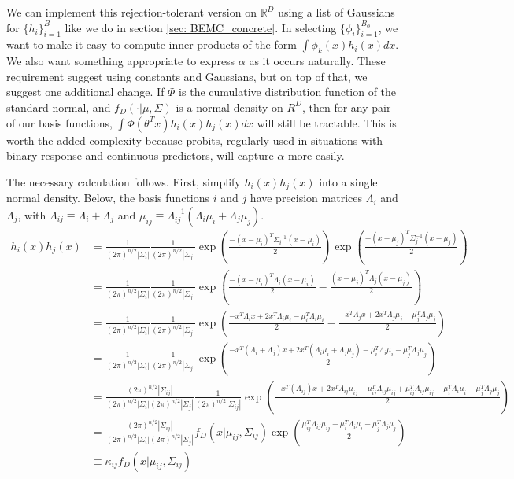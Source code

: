 \documentclass{article}
\begin{document}
We can implement this rejection-tolerant version on $\mathbb{R}^D$ using a list of Gaussians for $\{h_i\}_{i=1}^B$ like we do in section \ref{sec: BEMC_concrete}. In selecting $\{\phi_i\}_{i=1}^{B_\phi}$, we want to make it easy to compute inner products of the form $\int \phi_k(x)h_i(x)dx$. We also want something appropriate to express $\alpha$ as it occurs naturally. These requirement suggest using constants and Gaussians, but on top of that, we suggest one additional change. If $\Phi$ is the cumulative distribution function of the standard normal, and $f_D(\cdot|\mu, \Sigma)$ is a normal density on $R^D$, then for any pair of our basis functions, $\int \Phi(\theta ^T x)h_i(x)h_j(x)dx$ will still be tractable. This is worth the added complexity because probits, regularly used in situations with binary response and continuous predictors, will capture $\alpha$ more easily. 

The necessary calculation follows. First, simplify $h_i(x)h_j(x)$ into a single normal density. Below, the basis functions $i$ and $j$ have precision matrices $\Lambda_i$ and $\Lambda_j$, with $\Lambda_{ij}\equiv \Lambda_i+\Lambda_j$ and $\mu_{ij}\equiv \Lambda_{ij}^{-1}(\Lambda_i\mu_i+\Lambda_j\mu_j)$.
\begin{align*}
h_i(x)h_j(x) 
&=\frac{1}{(2\pi)^{n/2}|\Sigma_i|}
\frac{1}{(2\pi)^{n/2}|\Sigma_j|}
\exp(\frac{-(x-\mu_i)^T\Sigma_i^{-1}(x-\mu_i)}{2})
\exp(\frac{-(x-\mu_j)^T\Sigma_j^{-1}(x-\mu_j)}{2})\\
&=\frac{1}{(2\pi)^{n/2}|\Sigma_i|}
\frac{1}{(2\pi)^{n/2}|\Sigma_j|}
\exp(\frac{-(x-\mu_i)^T\Lambda_i(x-\mu_i)}{2}-\frac{(x-\mu_j)^T\Lambda_j(x-\mu_j)}{2})\\
&=\frac{1}{(2\pi)^{n/2}|\Sigma_i|}
\frac{1}{(2\pi)^{n/2}|\Sigma_j|}
\exp(\frac{-x^T\Lambda_ix+2x^T\Lambda_i\mu_i-\mu_i^T\Lambda_i\mu_i}{2}-\frac{-x^T\Lambda_jx+2x^T\Lambda_j\mu_j-\mu_j^T\Lambda_j\mu_j}{2})\\
&=\frac{1}{(2\pi)^{n/2}|\Sigma_i|}
\frac{1}{(2\pi)^{n/2}|\Sigma_j|}
\exp(\frac{-x^T(\Lambda_i+\Lambda_j)x
+2x^T(\Lambda_i\mu_i+\Lambda_j\mu_j)
-\mu_i^T\Lambda_i\mu_i-\mu_j^T\Lambda_j\mu_j}{2})\\
&=\frac{(2\pi)^{n/2}|\Sigma_{ij}|}{(2\pi)^{n/2}|\Sigma_i|(2\pi)^{n/2}|\Sigma_j|}
\frac{1}{(2\pi)^{n/2}|\Sigma_{ij}|}
\exp(\frac{
	-x^T(\Lambda_{ij})x 
	+2x^T\Lambda_{ij}\mu_{ij}
	-\mu_{ij}^T\Lambda_{ij}\mu_{ij}
	+\mu_{ij}^T\Lambda_{ij}\mu_{ij}
	-\mu_i^T\Lambda_i\mu_i-\mu_j^T\Lambda_j\mu_j
}{2})\\
&=\frac{(2\pi)^{n/2}|\Sigma_{ij}|}{(2\pi)^{n/2}|\Sigma_i|(2\pi)^{n/2}|\Sigma_j|}
 f_D(x|\mu_{ij}, \Sigma_{ij})
\exp(\frac{
	\mu_{ij}^T\Lambda_{ij}\mu_{ij}
	-\mu_i^T\Lambda_i\mu_i-\mu_j^T\Lambda_j\mu_j
}{2})\\
&\equiv \kappa_{ij} f_D(x|\mu_{ij}, \Sigma_{ij})\\
\end{align*}
\end{document}
